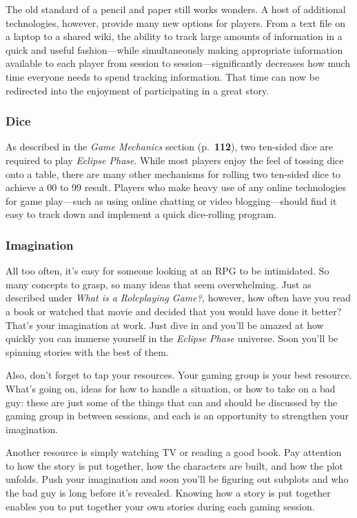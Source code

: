The old standard of a pencil and paper still works 
wonders. A host of additional technologies, however, provide many new options for players. From 
a text file on a laptop to a shared wiki, the ability 
to track large amounts of information in a quick 
and useful fashion—while simultaneously making 
appropriate information available to each player 
from session to session—significantly decreases 
how much time everyone needs to spend tracking 
information. That time can now be redirected into 
the enjoyment of participating in a great story.

\subsubsection{Dice}

As described in the \textit{Game Mechanics} section (p. \textbf{112}), 
two ten-sided dice are required to play \textit{Eclipse Phase}. 
While most players enjoy the feel of tossing dice onto 
a table, there are many other mechanisms for rolling 
two ten-sided dice to achieve a 00 to 99 result. Players 
who make heavy use of any online technologies for 
game play—such as using online chatting or video 
blogging—should find it easy to track down and 
implement a quick dice-rolling program.

\subsubsection{Imagination}

All too often, it's easy for someone looking at an 
RPG to be intimidated. So many concepts to grasp, 
so many ideas that seem overwhelming. Just as described under \textit{What is a Roleplaying Game?,} however, how often have you read a book or watched 
that movie and decided that you would have done 
it better? That's your imagination at work. Just dive 
in and you'll be amazed at how quickly you can immerse yourself in the \textit{Eclipse Phase} universe. Soon 
you'll be spinning stories with the best of them.

Also, don't forget to tap your resources. Your 
gaming group is your best resource. What's going on, 
ideas for how to handle a situation, or how to take 
on a bad guy: these are just some of the things that 
can and should be discussed by the gaming group 
in between sessions, and each is an opportunity to 
strengthen your imagination.

Another resource is simply watching TV or reading a good book. Pay attention to how the story is 
put together, how the characters are built, and how 
the plot unfolds. Push your imagination and soon 
you'll be figuring out subplots and who the bad guy 
is long before it's revealed. Knowing how a story is 
put together enables you to put together your own 
stories during each gaming session.


